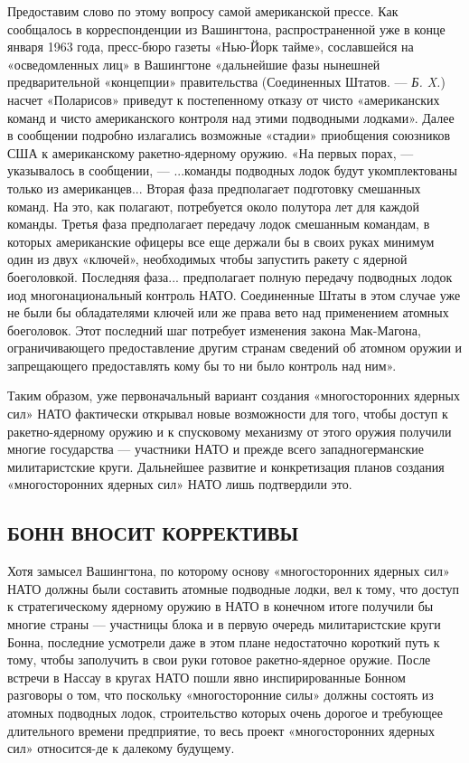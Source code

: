 \documentclass[12pt, a4paper, openany]{book}
\begin{document}
Предоставим слово по этому вопросу самой американской прессе. Как сообщалось в корреспонденции из Вашингтона, распространенной уже в конце января 1963 года, пресс-бюро газеты «Нью-Йорк тайме», сославшейся на «осведомленных лиц» в Вашингтоне «дальнейшие фазы нынешней  предварительной «концепции» правительства (Соединенных Штатов. — \textit{Б. X.}) насчет «Поларисов» приведут к постепенному отказу от чисто «американских команд и чисто американского  контроля над этими подводными лодками». Далее в сообщении подробно излагались возможные «стадии» приобщения  союзников США к американскому ракетно-ядерному оружию. «На первых порах, — указывалось в сообщении, — ...команды подводных лодок будут укомплектованы только из американцев... Вторая фаза предполагает подготовку смешанных  команд. На это, как полагают, потребуется около полутора лет для каждой команды. Третья фаза предполагает передачу лодок смешанным командам, в которых американские  офицеры все еще держали бы в своих руках минимум один из двух «ключей», необходимых чтобы запустить ракету с  ядерной боеголовкой. Последняя фаза... предполагает полную передачу подводных лодок иод многонациональный контроль НАТО. Соединенные Штаты в этом случае уже не были бы обладателями ключей или же права вето над применением атомных боеголовок. Этот последний шаг потребует изменения закона Мак-Магона, ограничивающего предоставление другим странам сведений об атомном оружии и  запрещающего предоставлять кому бы то ни было контроль над ним».

Таким образом, уже первоначальный вариант создания «многосторонних ядерных сил» НАТО фактически открывал новые возможности для того, чтобы доступ к  ракетно-ядерному оружию и к спусковому механизму от этого оружия  получили многие государства — участники НАТО и прежде всего западногерманские милитаристские круги. Дальнейшее  развитие и конкретизация планов создания «многосторонних ядерных сил» НАТО лишь подтвердили это.

	\subsection[Бонн вносит коррективы]{\center БОНН ВНОСИТ КОРРЕКТИВЫ}


Хотя замысел Вашингтона, по которому основу  «многосторонних ядерных сил» НАТО должны были составить атомные подводные лодки, вел к тому, что доступ к  стратегическому ядерному оружию в НАТО в конечном итоге получили бы многие страны — участницы блока и в первую очередь милитаристские круги Бонна, последние усмотрели даже в этом плане недостаточно короткий путь к тому, чтобы  заполучить в свои руки готовое ракетно-ядерное оружие. После встречи в Нассау в кругах НАТО пошли явно  инспирированные Бонном разговоры о том, что поскольку «многосторонние силы» должны состоять из атомных подводных лодок,  строительство которых очень дорогое и требующее длительного времени предприятие, то весь проект «многосторонних  ядерных сил» относится-де к далекому будущему.
\end{document}
